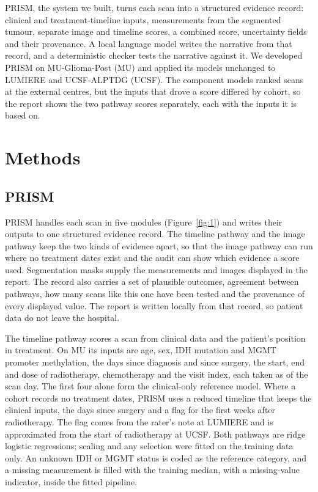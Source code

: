 \documentclass[largeformat]{interact} %
\begin{document}
PRISM, the system we built, turns each scan into a structured evidence record: clinical and treatment-timeline inputs,
measurements from the segmented tumour, separate image and timeline scores, a combined score, uncertainty fields and
their provenance. A local language model writes the narrative from that record, and a deterministic checker tests the
narrative against it. We developed PRISM on MU-Glioma-Post (MU) and applied its models unchanged to LUMIERE and UCSF-ALPTDG (UCSF). The
component models ranked scans at the external centres, but the inputs that drove a score differed by cohort, so the report shows the two pathway scores separately, each with the inputs it is based on.

\section{Methods}\label{sec:2}

\subsection{PRISM}\label{sec:2.1}

PRISM handles each scan in five modules (Figure~\ref{fig:1}) and writes their outputs to one structured evidence
record. The timeline pathway and the image pathway keep the two kinds of evidence apart, so that the image pathway
can run where no treatment dates exist and the audit can show which evidence a score used. Segmentation masks supply
the measurements and images displayed in the report. The record also carries a set of plausible outcomes, agreement
between pathways, how many scans like this one have been tested and the provenance of every displayed value. The
report is written locally from that record, so patient data do not leave the hospital.

The timeline pathway scores a scan from clinical data and the patient's position in treatment. On MU its inputs are age, sex, IDH mutation and MGMT promoter methylation, the days since diagnosis and since
surgery, the start, end and dose of radiotherapy, chemotherapy and the visit index, each taken as of the scan day. The
first four alone form the clinical-only reference model. Where a cohort records no treatment dates, PRISM uses a reduced timeline that
keeps the clinical inputs, the days since surgery and a flag for the first weeks after radiotherapy. The flag comes
from the rater's note at LUMIERE and is approximated from the start of radiotherapy at UCSF. Both pathways are ridge
logistic regressions; scaling and any selection were fitted on the training data only. An unknown IDH or MGMT status
is coded as the reference category, and a missing measurement is filled with the training median, with a
missing-value indicator, inside the fitted pipeline.
\end{document}
